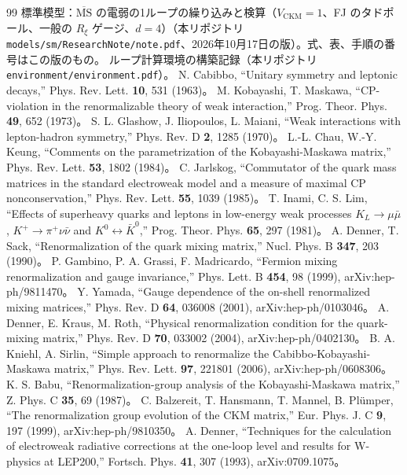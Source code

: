 \documentclass[a4paper,10pt]{ltjsarticle}
\newcommand{\MSbar}{\overline{\mathrm{MS}}}
\begin{document}
\begin{thebibliography}{99}
 標準模型：$\MSbar$ の電弱の1ループの繰り込みと検算（$V_{\mathrm{CKM}}=1$、FJ のタドポール、一般の $R_\xi$ ゲージ、$d=4$）（本リポジトリ \nolinkurl{models/sm/ResearchNote/note.pdf}、2026年10月17日の版）。式、表、手順の番号はこの版のもの。
 ループ計算環境の構築記録（本リポジトリ \nolinkurl{environment/environment.pdf}）。
 N. Cabibbo, ``Unitary symmetry and leptonic decays,'' Phys. Rev. Lett. \textbf{10}, 531 (1963)。
 M. Kobayashi, T. Maskawa, ``CP-violation in the renormalizable theory of weak interaction,'' Prog. Theor. Phys. \textbf{49}, 652 (1973)。
 S. L. Glashow, J. Iliopoulos, L. Maiani, ``Weak interactions with lepton-hadron symmetry,'' Phys. Rev. D \textbf{2}, 1285 (1970)。
 L.-L. Chau, W.-Y. Keung, ``Comments on the parametrization of the Kobayashi-Maskawa matrix,'' Phys. Rev. Lett. \textbf{53}, 1802 (1984)。
 C. Jarlskog, ``Commutator of the quark mass matrices in the standard electroweak model and a measure of maximal CP nonconservation,'' Phys. Rev. Lett. \textbf{55}, 1039 (1985)。
 T. Inami, C. S. Lim, ``Effects of superheavy quarks and leptons in low-energy weak processes $K_L\to\mu\bar\mu$, $K^+\to\pi^+\nu\bar\nu$ and $K^0\leftrightarrow\bar K^0$,'' Prog. Theor. Phys. \textbf{65}, 297 (1981)。
 A. Denner, T. Sack, ``Renormalization of the quark mixing matrix,'' Nucl. Phys. B \textbf{347}, 203 (1990)。
 P. Gambino, P. A. Grassi, F. Madricardo, ``Fermion mixing renormalization and gauge invariance,'' Phys. Lett. B \textbf{454}, 98 (1999), arXiv:hep-ph/9811470。
 Y. Yamada, ``Gauge dependence of the on-shell renormalized mixing matrices,'' Phys. Rev. D \textbf{64}, 036008 (2001), arXiv:hep-ph/0103046。
 A. Denner, E. Kraus, M. Roth, ``Physical renormalization condition for the quark-mixing matrix,'' Phys. Rev. D \textbf{70}, 033002 (2004), arXiv:hep-ph/0402130。
 B. A. Kniehl, A. Sirlin, ``Simple approach to renormalize the Cabibbo-Kobayashi-Maskawa matrix,'' Phys. Rev. Lett. \textbf{97}, 221801 (2006), arXiv:hep-ph/0608306。
 K. S. Babu, ``Renormalization-group analysis of the Kobayashi-Maskawa matrix,'' Z. Phys. C \textbf{35}, 69 (1987)。
 C. Balzereit, T. Hansmann, T. Mannel, B. Plümper, ``The renormalization group evolution of the CKM matrix,'' Eur. Phys. J. C \textbf{9}, 197 (1999), arXiv:hep-ph/9810350。
 A. Denner, ``Techniques for the calculation of electroweak radiative corrections at the one-loop level and results for W-physics at LEP200,'' Fortsch. Phys. \textbf{41}, 307 (1993), arXiv:0709.1075。

\end{thebibliography}
\end{document}
